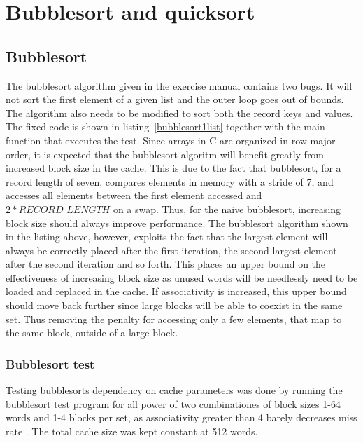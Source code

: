 \section{Bubblesort and quicksort}

\subsection{Bubblesort}
The bubblesort algorithm given in the exercise manual contains two bugs. It will not sort the first element of a given list and the 
outer loop goes out of bounds. The algorithm also needs to be modified to sort both the record keys and values. 
The fixed code is shown in listing~\ref{bubblesort1list} together with the main function that executes the test.
Since arrays in C are organized in row-major order, it is expected that the bubblesort algoritm will benefit greatly from increased
block size in the cache. This is due to the fact that bubblesort, for a record length of seven, compares elements in memory with a 
stride of 7, and accesses all elements between the first element accessed and \(2*RECORD\_LENGTH\) on a swap. Thus, for the naive
bubblesort, increasing block size should always improve performance. The bubblesort algorithm shown in the listing above, however, 
exploits the fact that the largest element will always be correctly placed after the first iteration, the second largest element
after the second iteration and so forth. This places an upper bound on the effectiveness of increasing block size as unused words
will be needlessly need to be loaded and replaced in the cache. If associativity is increased, this upper bound should move back
further since large blocks will be able to coexist in the same set. Thus removing the penalty for accessing only a few 
elements, that map to the same block, outside of a large block.

\subsubsection{Bubblesort test}
Testing bubblesorts dependency on cache parameters was done by running the bubblesort test program for all power of two combinationes
of block sizes 1-64 words and 1-4 blocks per set, as associativity greater than 4 barely decreases miss rate \cite[p.~484]{HandP}.
The total cache size was kept constant at 512 words.

